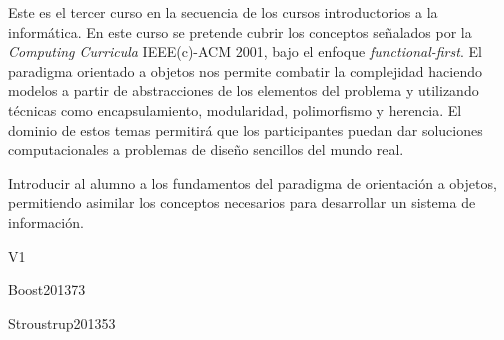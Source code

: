 \begin{syllabus}


\begin{justification}
   Este es el tercer curso en la secuencia de los cursos introductorios a la informática. En este curso se pretende cubrir los conceptos señalados por la \textit{Computing Curricula} IEEE(c)-ACM 2001, bajo el enfoque \textit{functional-first}. 
   El paradigma orientado a objetos nos permite combatir la complejidad haciendo modelos a partir de abstracciones de los elementos del problema y utilizando técnicas como encapsulamiento,
   modularidad, polimorfismo y herencia. El dominio de estos temas permitirá que los participantes puedan dar soluciones computacionales a problemas de diseño sencillos del mundo real.
   \end{justification}
   
   \begin{goals}
   \item Introducir al alumno a los fundamentos del paradigma de orientación a objetos, permitiendo asimilar los conceptos necesarios para desarrollar un sistema de información.
   \end{goals}
   
   \begin{outcomes}{V1}
      \item {}
      \item {}
      \item {}
      \item {}
      \item {}
      \item {}
   \end{outcomes}
   
   \begin{unit}{\DSGraphsandTrees}{}{Boost2013}{7}{3}
       \DSGraphsandTreesAllTopics
       \DSGraphsandTreesAllLearningOutcomes
   \end{unit}
   
   \begin{unit}{\GVFundamentalConcepts}{}{Stroustrup2013}{5}{3}
      \GVFundamentalConceptsAllTopics
      \GVFundamentalConceptsAllLearningOutcomes
   \end{unit}
   

\end{syllabus}
